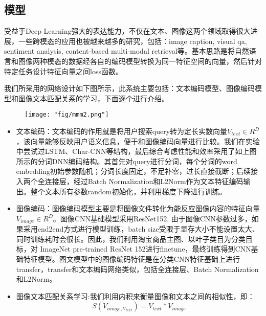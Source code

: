 \subsection{模型}
受益于Deep Learning强大的表达能力，不仅在文本、图像这两个领域取得很大进展，一些跨模态的应用也被越来越多的研究，包括：image caption, visual qa, sentiment analysis, content-based multi-modal retrieval等。基本思路是将自然语言和图像两种模态的数据经各自的编码模型转换为同一特征空间的向量，然后针对特定任务设计特征向量之间loss函数。
\par 我们所采用的网络设计如下图所示，此系统主要包括：文本编码模型、图像编码模型和图像文本匹配关系的学习，下面逐个进行介绍。 
\begin{figure}[!h]
	\centering
	\texttt{[image: "fig/mmm2.png"]}
	\caption{}
	\label{fig:mmm2}
\end{figure}
\begin{itemize}
\item 文本编码：文本编码的作用就是将用户搜索query转为定长实数向量$V_{text} \in R^D$，该向量能够反映用户语义信息，便于和图像编码向量进行比较。我们在实验中尝试过LSTM、Char-CNN等结构，最后综合考虑性能和效率采用了如上图所示的分词DNN编码结构。其首先对query进行分词，每个分词的word embedding初始参数随机；分词长度固定，不足补零，过长直接截断；后续接入两个全连接层，经过Batch Normalization和L2Norm作为文本特征编码输出。整个文本所有参数random初始化，并利用梯度下降进行训练。
\item 图像编码：图像编码模型主要是将图像文件转化为能反应图像内容的特征向量$V_{image} \in R^D$。图像CNN基础模型采用ResNet152, 由于图像CNN参数过多，如果采用end2end方式进行模型训练，batch size受限于显存大小不能设置太大、同时训练耗时会很长。因此，我们利用淘宝商品主图、以叶子类目为分类目标，对 ImageNet pre-trained ResNet 152进行finetune，最终训练得到CNN基础特征模型。图文模型中的图像编码特征是在分类CNN特征基础上进行transfer，transfer和文本编码网络类似，包括全连接层、Batch Normalization和L2Norm。
\item 图像文本匹配关系学习:我们利用内积来衡量图像和文本之间的相似性，即： $$S(V_{image, V_{text}}) = V_{text} * V_{image}$$
\end{itemize}

